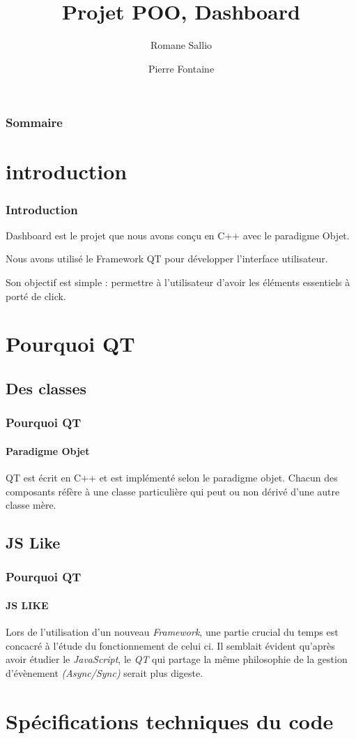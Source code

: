 \documentclass[10pt]{beamer}
\title{Projet POO, Dashboard}
\author{Romane Sallio \and Pierre Fontaine}
\institute{UPPA, Licence, Informatique}
\begin{document}
\begin{frame}
  \titlepage
\end{frame}

\begin{frame}
  \frametitle{Sommaire}
  \tableofcontents
\end{frame}

\section{introduction}

\begin{frame}
  \frametitle{Introduction}
  Dashboard est le projet que nous avons conçu en C++ avec le paradigme Objet.

  Nous avons utilisé le Framework QT pour développer l'interface utilisateur.

  Son objectif est simple : permettre à l'utilisateur d'avoir les éléments essentiels à porté de click.
\end{frame}

\section{Pourquoi QT}
\subsection{Des classes}
\begin{frame}
  \frametitle{Pourquoi QT}
  \framesubtitle{Paradigme Objet}
  QT est écrit en C++ et est implémenté selon le paradigme objet. Chacun des composants réfère à une classe particulière qui peut ou non dérivé d'une autre classe mère.
\end{frame}
  \subsection{JS Like}
    \begin{frame}
      \frametitle{Pourquoi QT}
      \framesubtitle{JS LIKE}
      Lors de l'utilisation d'un nouveau \emph{Framework}, une partie crucial du temps est concacré à l'étude du fonctionnement de celui ci. Il semblait évident qu'après avoir étudier le \emph{JavaScript}, le \emph{QT} qui partage la même philosophie de la gestion d'évènement \emph{(Async/Sync)} serait plus digeste.
    \end{frame}
\section{Spécifications techniques du code}
\end{document}
